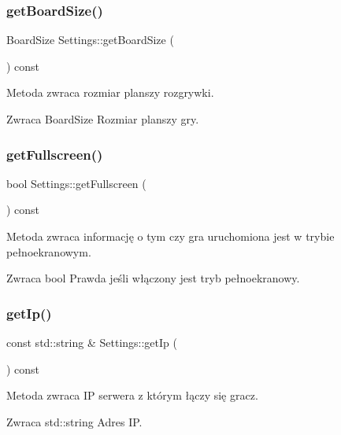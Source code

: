 \subsubsection{getBoardSize()}
{\footnotesize\ttfamily Board\+Size Settings\+::get\+Board\+Size (\begin{DoxyParamCaption}{ }\end{DoxyParamCaption}) const}



Metoda zwraca rozmiar planszy rozgrywki. 

\begin{DoxyReturn}{Zwraca}
Board\+Size Rozmiar planszy gry. 
\end{DoxyReturn}
\mbox{\label{class_settings_a18f7dcb86a9d608ce180c0bc66d581cd}} 
\subsubsection{getFullscreen()}
{\footnotesize\ttfamily bool Settings\+::get\+Fullscreen (\begin{DoxyParamCaption}{ }\end{DoxyParamCaption}) const}



Metoda zwraca informację o tym czy gra uruchomiona jest w trybie pełnoekranowym. 

\begin{DoxyReturn}{Zwraca}
bool Prawda jeśli włączony jest tryb pełnoekranowy. 
\end{DoxyReturn}
\mbox{\label{class_settings_a525427a20fdbf66961c1abc460607f07}} 
\subsubsection{getIp()}
{\footnotesize\ttfamily const std\+::string \& Settings\+::get\+Ip (\begin{DoxyParamCaption}{ }\end{DoxyParamCaption}) const}



Metoda zwraca IP serwera z którym łączy się gracz. 

\begin{DoxyReturn}{Zwraca}
std\+::string Adres IP. 
\end{DoxyReturn}
\mbox{\label{class_settings_a91b6e73e5cc8288bf9bb401db2e76e9d}} 
